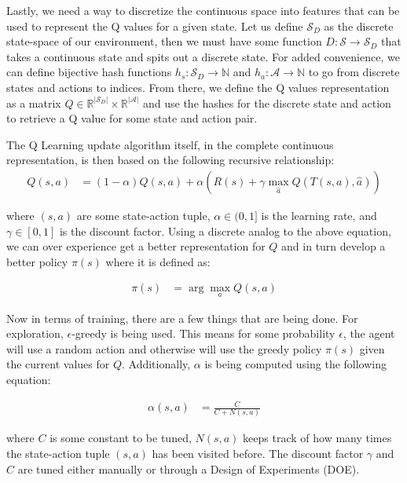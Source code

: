 \documentclass{article}[12pt]
\begin{document}
   Lastly, we need a way to discretize the continuous space into features that can be used to represent the Q values for a given state. Let us define $\mathcal{S}_D$ as the discrete state-space of our environment, then we must have some function $D: \mathcal{S} \rightarrow \mathcal{S}_D$ that takes a continuous state and spits out a discrete state. For added convenience, we can define bijective hash functions $h_s: \mathcal{S}_D \rightarrow \mathbb{N}$ and $h_a: \mathcal{A} \rightarrow \mathbb{N}$ to go from discrete states and actions to indices. From there, we define the Q values representation as a matrix $Q \in \mathbb{R}^{|\mathcal{S}_D|} \times \mathbb{R}^{|\mathcal{A}|} $ and use the hashes for the discrete state and action to retrieve a Q value for some state and action pair.
   
   The Q Learning update algorithm itself, in the complete continuous representation, is then based on the following recursive relationship:
   \begin{align}
   Q(s,a) &= (1 - \alpha) Q(s,a) + \alpha \left( R(s) + \gamma \max_{\hat{a}} Q( T(s,a), \hat{a})\right) \label{eq:qlrn}
   \end{align}
   
   where $(s,a)$ are some state-action tuple, $\alpha \in (0,1]$ is the learning rate, and $\gamma \in [0,1]$ is the discount factor. Using a discrete analog to the above equation, we can over experience get a better representation for $Q$ and in turn develop a better policy $\pi(s)$ where it is defined as:
   
   \begin{align}
   \pi(s) &= \arg \max_{a} Q(s,a)
   \end{align}
   
   Now in terms of training, there are a few things that are being done. For exploration, $\epsilon$-greedy is being used. This means for some probability $\epsilon$, the agent will use a random action and otherwise will use the greedy policy $\pi(s)$ given the current values for $Q$. Additionally, $\alpha$ is being computed using the following equation:
   
   \begin{align}
   \alpha(s,a) &= \frac{C}{C + N(s,a)}
   \end{align}
   
   where $C$ is some constant to be tuned, $N(s,a)$ keeps track of how many times the state-action tuple $(s,a)$ has been visited before. The discount factor $\gamma$ and $C$ are tuned either manually or through a Design of Experiments (DOE).
   
\end{document}
